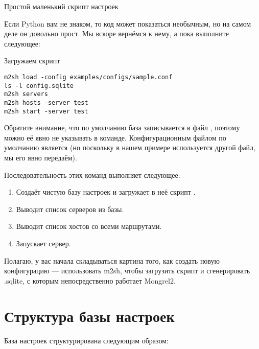 \begin{code}{Простой маленький скрипт настроек}
  
\end{code}

Если Python вам не знаком, то код может показаться необычным, но на
самом деле он довольно прост. Мы вскоре вернёмся к нему, а пока
выполните следующее:

\begin{code}{Загружаем скрипт}
\begin{lstlisting}
m2sh load -config examples/configs/sample.conf
ls -l config.sqlite
m2sh servers
m2sh hosts -server test
m2sh start -server test
\end{lstlisting}
\end{code}

Обратите внимание, что по умолчанию база записывается в файл
, поэтому можно её явно не указывать в команде.
Конфигурационным файлом по умолчанию является  (но
поскольку в нашем примере используется другой файл, мы его явно
передаём).

Последовательность этих команд выполняет следующее:

\begin{enumerate}
\item Создаёт чистую базу настроек  и загружает
в неё скрипт .
\item Выводит список серверов из базы.
\item Выводит список хостов со всеми маршрутами.
\item Запускает сервер.
\end{enumerate}

Полагаю, у вас начала складываться картина того, как создать новую
конфигурацию --- использовать m2sh, чтобы загрузить скрипт и
сгенерировать .sqlite, с которым непосредственно работает Mongrel2.

\section{Структура базы настроек}

База настроек структурирована следующим образом:

